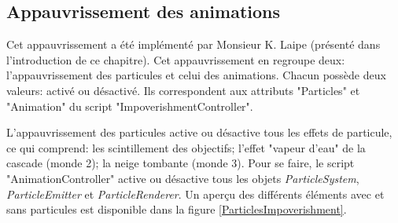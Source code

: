 		\begin{minipage}{\linewidth}
			\label{LightImpoverishment}
		\end{minipage}\medskip		
		
	\subsection*{Appauvrissement des animations}
	
		Cet appauvrissement a été implémenté par Monsieur K. Laipe (présenté dans l'introduction de ce chapitre). Cet appauvrissement en regroupe deux: l'appauvrissement des particules et celui des animations. Chacun possède deux valeurs: activé ou désactivé. Ils correspondent aux attributs "Particles" et "Animation" du script "ImpoverishmentController".
		
		L'appauvrissement des particules active ou désactive tous les effets de particule, ce qui comprend: les scintillement des objectifs; l'effet "vapeur d'eau" de la cascade (monde 2); la neige tombante (monde 3). Pour se faire, le script "AnimationController" active ou désactive tous les objets \textit{ParticleSystem}, \textit{ParticleEmitter} et \textit{ParticleRenderer}. Un aperçu des différents éléments avec et sans particules est disponible dans la figure \ref{ParticlesImpoverishment}.\medskip
		
		\begin{minipage}{\linewidth}
			\label{ParticlesImpoverishment}
		\end{minipage}\medskip	
		\\
		
